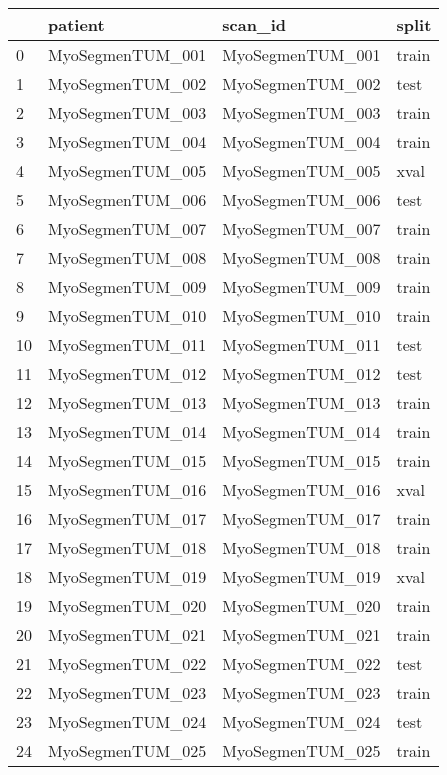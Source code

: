 \begin{tabular}{llll}
\toprule
{} &           patient &           scan\_id &  split \\
\midrule
0   &  MyoSegmenTUM\_001 &  MyoSegmenTUM\_001 &  train \\
1   &  MyoSegmenTUM\_002 &  MyoSegmenTUM\_002 &   test \\
2   &  MyoSegmenTUM\_003 &  MyoSegmenTUM\_003 &  train \\
3   &  MyoSegmenTUM\_004 &  MyoSegmenTUM\_004 &  train \\
4   &  MyoSegmenTUM\_005 &  MyoSegmenTUM\_005 &   xval \\
5   &  MyoSegmenTUM\_006 &  MyoSegmenTUM\_006 &   test \\
6   &  MyoSegmenTUM\_007 &  MyoSegmenTUM\_007 &  train \\
7   &  MyoSegmenTUM\_008 &  MyoSegmenTUM\_008 &  train \\
8   &  MyoSegmenTUM\_009 &  MyoSegmenTUM\_009 &  train \\
9   &  MyoSegmenTUM\_010 &  MyoSegmenTUM\_010 &  train \\
10  &  MyoSegmenTUM\_011 &  MyoSegmenTUM\_011 &   test \\
11  &  MyoSegmenTUM\_012 &  MyoSegmenTUM\_012 &   test \\
12  &  MyoSegmenTUM\_013 &  MyoSegmenTUM\_013 &  train \\
13  &  MyoSegmenTUM\_014 &  MyoSegmenTUM\_014 &  train \\
14  &  MyoSegmenTUM\_015 &  MyoSegmenTUM\_015 &  train \\
15  &  MyoSegmenTUM\_016 &  MyoSegmenTUM\_016 &   xval \\
16  &  MyoSegmenTUM\_017 &  MyoSegmenTUM\_017 &  train \\
17  &  MyoSegmenTUM\_018 &  MyoSegmenTUM\_018 &  train \\
18  &  MyoSegmenTUM\_019 &  MyoSegmenTUM\_019 &   xval \\
19  &  MyoSegmenTUM\_020 &  MyoSegmenTUM\_020 &  train \\
20  &  MyoSegmenTUM\_021 &  MyoSegmenTUM\_021 &  train \\
21  &  MyoSegmenTUM\_022 &  MyoSegmenTUM\_022 &   test \\
22  &  MyoSegmenTUM\_023 &  MyoSegmenTUM\_023 &  train \\
23  &  MyoSegmenTUM\_024 &  MyoSegmenTUM\_024 &   test \\
24  &  MyoSegmenTUM\_025 &  MyoSegmenTUM\_025 &  train \\

\end{tabular}
